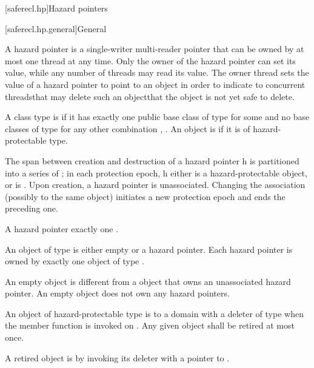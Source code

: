 
[saferecl.hp]{Hazard pointers}

[saferecl.hp.general]{General}

A hazard pointer is a single-writer multi-reader pointer that can be owned by at most one thread at any time. Only the owner of the hazard pointer can set its value, while any number of threads may read its value. The owner thread sets the value of a hazard pointer to point to an object in order to indicate to concurrent threads\textemdash that may delete such an object\textemdash that the object is not yet safe to delete.

A class type  is  if it has exactly one public base class of type  for some  and no base classes of type  for any other combination , . An object is  if it is of hazard-protectable type.

The span between creation and destruction of a hazard pointer h is partitioned into a series of ; in each protection epoch, h either is  a hazard-protectable object, or is . Upon creation, a hazard pointer is unassociated. Changing the association (possibly to the same object) initiates a new protection epoch and ends the preceding one.

A hazard pointer  exactly one . 

An object of type  is either empty or  a hazard pointer. Each hazard pointer is owned by exactly one object of type . \begin{note} An empty  object is different from a  object that owns an unassociated hazard pointer. An empty  object does not own any hazard pointers.\end{note}

An object  of hazard-protectable type  is  to a domain with a deleter of type  when the member function  is invoked on . Any given object  shall be retired at most once.

A retired object  is  by invoking its deleter with a pointer to .

